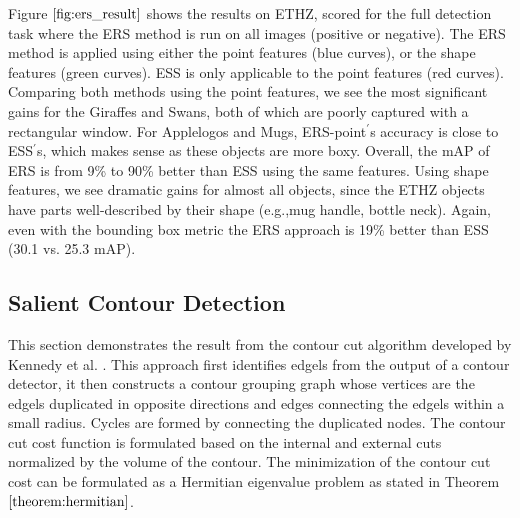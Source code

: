 \documentclass{SMBV12}
\begin{document}
Figure $\ref{fig:ers_result}$ shows the results on ETHZ, scored for the full detection task where the ERS method is run on all images (positive or negative). The ERS method is applied using either the point features (blue curves), or the shape features (green curves). ESS is only applicable to the point features (red curves). Comparing both methods using the point features, we see the most significant gains for the Giraffes and Swans, both of which are poorly captured with a rectangular window. For Applelogos and Mugs, ERS-point$^\prime$s accuracy is close to ESS$^\prime$s, which makes sense as these objects are more boxy. Overall, the mAP of ERS is from 9\% to 90\% better than ESS using the same features. Using shape features, we see dramatic gains for almost all objects, since the ETHZ objects have parts well-described by their shape (e.g.,mug handle, bottle neck). Again, even with the bounding box metric the ERS approach is 19\% better than ESS (30.1 vs. 25.3 mAP).

\subsection{Salient Contour Detection}

This section demonstrates the result from the contour cut algorithm developed by Kennedy et al. \cite{KenGalShi2011}. This approach first identifies edgels from the output of a contour detector, it then constructs a contour grouping graph whose vertices are the edgels duplicated in opposite directions and edges connecting the edgels within a small radius. Cycles are formed by connecting the duplicated nodes. The contour cut cost function is formulated based on the internal and external cuts normalized by the volume of the contour. The minimization of the contour cut cost can be formulated as a Hermitian eigenvalue problem as stated in Theorem $\ref{theorem:hermitian}$.
\end{document}
